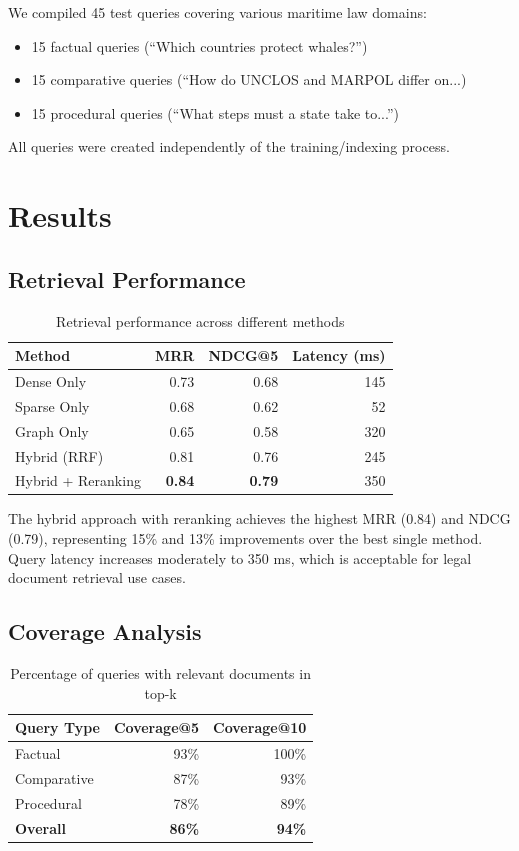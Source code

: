 \documentclass[11pt,a4paper]{article}
\begin{document}
We compiled 45 test queries covering various maritime law domains:
\begin{itemize}
\item 15 factual queries (``Which countries protect whales?'')
\item 15 comparative queries (``How do UNCLOS and MARPOL differ on...)
\item 15 procedural queries (``What steps must a state take to...'')
\end{itemize}

All queries were created independently of the training/indexing process.

\section{Results}

\subsection{Retrieval Performance}

\begin{table}
\centering
\begin{tabular}{lrrr}
\hline
\textbf{Method} & \textbf{MRR} & \textbf{NDCG@5} & \textbf{Latency (ms)} \\
\hline
Dense Only & 0.73 & 0.68 & 145 \\
Sparse Only & 0.68 & 0.62 & 52 \\
Graph Only & 0.65 & 0.58 & 320 \\
Hybrid (RRF) & 0.81 & 0.76 & 245 \\
Hybrid + Reranking & \textbf{0.84} & \textbf{0.79} & 350 \\
\hline
\end{tabular}
\caption{Retrieval performance across different methods}
\label{tab:retrieval}
\end{table}

The hybrid approach with reranking achieves the highest MRR (0.84) and NDCG (0.79), representing 15\% and 13\% improvements over the best single method. Query latency increases moderately to 350 ms, which is acceptable for legal document retrieval use cases.

\subsection{Coverage Analysis}

\begin{table}
\centering
\begin{tabular}{lrr}
\hline
\textbf{Query Type} & \textbf{Coverage@5} & \textbf{Coverage@10} \\
\hline
Factual & 93\% & 100\% \\
Comparative & 87\% & 93\% \\
Procedural & 78\% & 89\% \\
\hline
\textbf{Overall} & \textbf{86\%} & \textbf{94\%} \\
\hline
\end{tabular}
\caption{Percentage of queries with relevant documents in top-k}
\label{tab:coverage}
\end{table}
\end{document}
